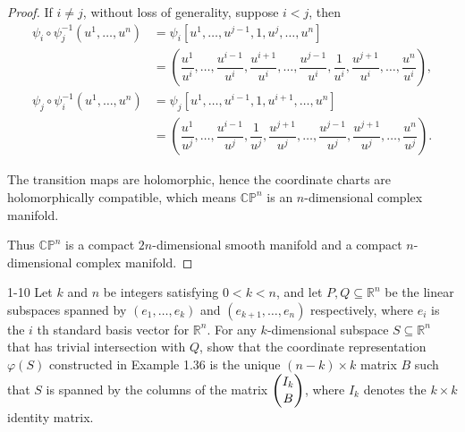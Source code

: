 \begin{proof}
    If \( i \ne j \), without loss of generality, suppose \( i < j \), then
    \begingroup
    \allowdisplaybreaks%
    \begin{align*}
        \psi_{i} \circ \psi_{j}^{-1}(u^{1}, \ldots, u^{n}) & = \psi_{i}[u^{1}, \ldots, u^{j-1}, 1, u^{j}, \ldots, u^{n}]                                                                                                                                            \\
                                                           & = \left( \dfrac{u^{1}}{u^{i}}, \ldots, \dfrac{u^{i-1}}{u^{i}}, \dfrac{u^{i+1}}{u^{i}}, \ldots, \dfrac{u^{j-1}}{u^{i}}, \dfrac{1}{u^{i}}, \dfrac{u^{j+1}}{u^{i}}, \ldots, \dfrac{u^{n}}{u^{i}} \right), \\
        \psi_{j} \circ \psi_{i}^{-1}(u^{1}, \ldots, u^{n}) & = \psi_{j}[u^{1}, \ldots, u^{i-1}, 1, u^{i+1}, \ldots, u^{n}]                                                                                                                                          \\
                                                           & = \left( \dfrac{u^{1}}{u^{j}}, \ldots, \dfrac{u^{i-1}}{u^{j}}, \dfrac{1}{u^{j}}, \dfrac{u^{j+1}}{u^{j}}, \ldots, \dfrac{u^{j-1}}{u^{j}}, \dfrac{u^{j+1}}{u^{j}}, \ldots, \dfrac{u^{n}}{u^{j}} \right).
    \end{align*}
    \endgroup

    The transition maps are holomorphic, hence the coordinate charts are holomorphically compatible, which means \( \mathbb{CP}^{n} \) is an \( n \)-dimensional complex manifold.

    Thus \( \mathbb{CP}^{n} \) is a compact \(2n\)-dimensional smooth manifold and a compact \(n\)-dimensional complex manifold.
\end{proof}

\begin{problem}{1-10}
    Let \( k \) and \( n \) be integers satisfying \( 0 < k < n \), and let \( P, Q \subseteq \mathbb{R}^{n} \) be the linear subspaces spanned by \( (e_{1}, \ldots, e_{k}) \) and \( (e_{k+1}, \ldots, e_{n}) \) respectively, where \( e_{i} \) is the \(i\) th standard basis vector for \( \mathbb{R}^{n} \). For any \(k\)-dimensional subspace \( S \subseteq \mathbb{R}^{n} \) that has trivial intersection with \( Q \), show that the coordinate representation \( \varphi(S) \) constructed in Example 1.36 is the unique \( (n - k) \times k \) matrix \( B \) such that \( S \) is spanned by the columns of the matrix \( \dbinom{I_{k}}{B} \), where \( I_{k} \) denotes the \( k \times k \) identity matrix.
\end{problem}

